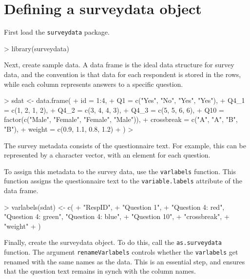 \documentclass[a4paper]{article}
\newcommand{\sdata}{{\tt surveydata}}
\begin{document}

\section{Defining a surveydata object}

First load the \sdata{} package.

\begin{Schunk}
\begin{Sinput}
> library(surveydata)
\end{Sinput}
\end{Schunk}

Next, create sample data. A data frame is the ideal data structure for survey data, and the convention is that data for each respondent is stored in the rows, while each column represents answers to a specific question.

\begin{Schunk}
\begin{Sinput}
> sdat <- data.frame(
+     id   = 1:4,
+     Q1   = c("Yes", "No", "Yes", "Yes"),
+     Q4_1 = c(1, 2, 1, 2), 
+     Q4_2 = c(3, 4, 4, 3), 
+     Q4_3 = c(5, 5, 6, 6), 
+     Q10 = factor(c("Male", "Female", "Female", "Male")),
+     crossbreak  = c("A", "A", "B", "B"), 
+     weight      = c(0.9, 1.1, 0.8, 1.2)
+ )
> 
\end{Sinput}
\end{Schunk}


The survey metadata consists of the questionnaire text.  For example, this can be represented by a character vector, with an element for each question.

To assign this metadata to the survey data, use the \texttt{varlabels} function.  This function assigns the questionnaire text to the \texttt{variable.labels} attribute of the data frame.

\begin{Schunk}
\begin{Sinput}
> varlabels(sdat) <- c(
+     "RespID",
+     "Question 1", 
+     "Question 4: red", "Question 4: green", "Question 4: blue", 
+     "Question 10",
+     "crossbreak",
+     "weight"
+   )
\end{Sinput}
\end{Schunk}


Finally, create the surveydata object. To do this, call the \texttt{as.surveydata} function.  The argument \texttt{renameVarlabels} controls whether the \texttt{varlabels} get renamed with the same names as the data.  This is an essential step, and ensures that the question text remains in synch with the column names.
\end{document}
